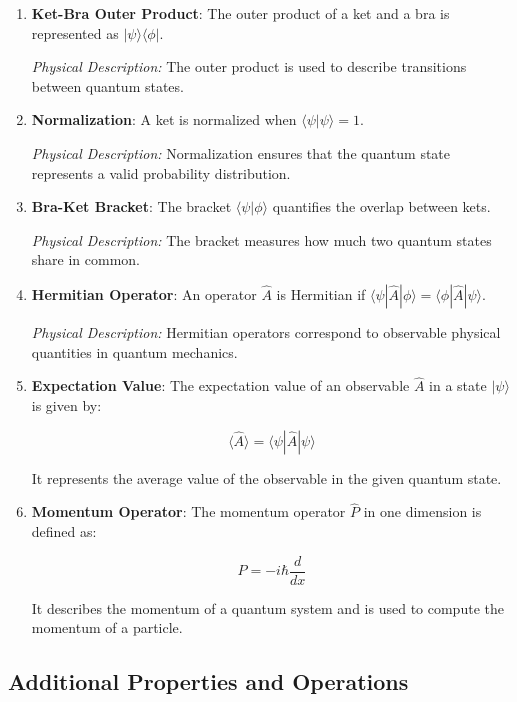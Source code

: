 \documentclass[a4paper]{article}
\begin{document}
\begin{enumerate}
    \item \textbf{Ket-Bra Outer Product}: The outer product of a ket and a bra is represented as $|\psi\rangle\langle\phi|$.
    
    \textit{Physical Description:} The outer product is used to describe transitions between quantum states.

    \item \textbf{Normalization}: A ket is normalized when $\langle\psi|\psi\rangle = 1$.
    
    \textit{Physical Description:} Normalization ensures that the quantum state represents a valid probability distribution.

    \item \textbf{Bra-Ket Bracket}: The bracket $\langle\psi|\phi\rangle$ quantifies the overlap between kets.
    
    \textit{Physical Description:} The bracket measures how much two quantum states share in common.

    \item \textbf{Hermitian Operator}: An operator $\hat{A}$ is Hermitian if $\langle\psi|\hat{A}|\phi\rangle = \langle\phi|\hat{A}|\psi\rangle$.
    
    \textit{Physical Description:} Hermitian operators correspond to observable physical quantities in quantum mechanics.

    \item \textbf{Expectation Value}: The expectation value of an observable $\hat{A}$ in a state $|\psi\rangle$ is given by:
    
    \[
    \langle \hat{A} \rangle = \langle \psi | \hat{A} | \psi \rangle
    \]

    It represents the average value of the observable in the given quantum state.

    \item \textbf{Momentum Operator}: The momentum operator $\hat{P}$ in one dimension is defined as:
    
    \[
    \hat{P} = -i\hbar \frac{d}{dx}
    \]

    It describes the momentum of a quantum system and is used to compute the momentum of a particle.

\end{enumerate}

\subsection*{Additional Properties and Operations}
\end{document}
